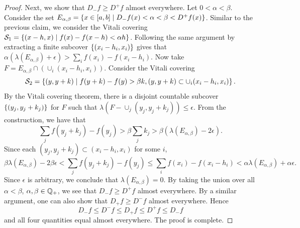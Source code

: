\begin{proof}
    Next, we show that $D_-f\geq D^+f$ almost everywhere. Let $0<\alpha<\beta$. 
    Consider the set $E_{\alpha, \beta} = \left\{ x\in [a,b] \;\middle\vert\; D_-f(x)<\alpha<\beta<D^+f(x) \right\}$. 
    Similar to the previous claim, we consider the Vitali covering 
    $\mathcal{S}_1 = \left\{ (x-h,x) \;\middle\vert\; f(x)-f(x-h)< \alpha h \right\}$. Following the same 
    argument by extracting a finite subcover $\left\{ {(x_i-h_i,x_i)} \right\}$ gives that 
    $\alpha(\lambda(E_{\alpha,\beta})+\epsilon)> \sum_i f(x_i)-f(x_i-h_i)$. Now take 
    $F = E_{\alpha,\beta}\cap(\cup_i (x_i-h_i,x_i))$. Consider the 
    Vitali covering 
    \begin{equation*}
        \mathcal{S}_2 = \left\{ (y,y+k) \;\middle\vert\; f(y+k) - f(y)>\beta k, (y,y+k)\subset \cup_i (x_i-h_i,x_i) \right\}.
    \end{equation*}
    By the Vitali covering theorem, there is a disjoint countable 
    subcover $\left\{ {(y_j, y_j+k_j)} \right\}$ for $F$ such that 
    $\lambda(F-\cup_j(y_j, y_j+k_j)) \leq \epsilon$. From the construction, 
    we have that 
    \begin{equation*}
        \sum_j f(y_j+k_j) - f(y_j) > \beta \sum_j k_j > \beta(\lambda(E_{\alpha,\beta})-2\epsilon).
    \end{equation*}
    Since each $(y_j, y_j+k_j)\subset (x_i-h_i,x_i)$ for some $i$, 
    \begin{equation*}
        \beta\lambda(E_{\alpha,\beta})-2\beta\epsilon < \sum_j f(y_j+k_j) - f(y_j) \leq \sum_i f(x_i)-f(x_i-h_i)<\alpha\lambda(E_{\alpha, \beta})+\alpha\epsilon.
    \end{equation*}
    Since $\epsilon$ is arbitrary, we conclude that $\lambda(E_{\alpha,\beta}) = 0$. 
    By taking the union over all $\alpha<\beta$, $\alpha, \beta\in\mathbb{Q}_+$, 
    we see that $D_-f\geq D^+f$ almost everywhere. By a similar argument, 
    one can also show that $D_+f\geq D^- f$ almost everywhere. Hence 
    \begin{equation*}
        D_-f\leq D^-f\leq D_+f\leq D^+f\leq D_-f
    \end{equation*}
    and all four quantities equal almost everywhere. The proof is complete. 
\end{proof}